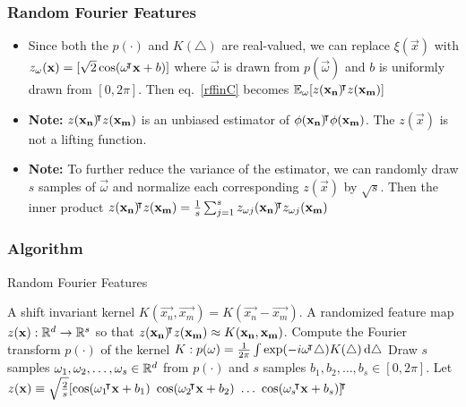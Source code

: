 \documentclass[10pt]{../formats/RU}
\begin{document}
\begin{frame}
  \frametitle{Random Fourier Features}
  \begin{itemize}
    \item <1-> Since both the $p(\cdot)$ and $K(\triangle)$ are real-valued, we can replace $\xi(\vec{x})$ with $z_{\mathbf{\omega}}(\mathbf{x})=[\sqrt{2}\cos(\mathbf{\omega}{}^{\mkern-4mu\intercal}\mathbf{x}+b)]$ where $\vec{\omega}$ is drawn from $p(\vec{\omega})$ and $b$ is uniformly drawn from $[0, 2\pi]$. Then eq.~\eqref{rffinC} becomes $\mathbb{E}_{\mathbf{\omega}}[z(\mathbf{x_n}){}^{\mkern-4mu\intercal} z(\mathbf{x_m})]$
    \item <2-> \textbf{Note:} $z(\mathbf{x_n}){}^{\mkern-4mu\intercal} z(\mathbf{x_m})$ is an unbiased estimator of $\phi(\mathbf{x_n}){}^{\mkern-4mu\intercal}\phi(\mathbf{x_m})$. The $z(\vec{x})$ is not a lifting function.
    \item <3-> \textbf{Note:} To further reduce the variance of the estimator, we can randomly draw $s$ samples of $\vec{\omega}$ and normalize each corresponding $z(\vec{x})$ by $\sqrt{s}$. Then the inner product $z(\mathbf{x_n}){}^{\mkern-4mu\intercal} z(\mathbf{x_m})=\frac{1}{s}\sum_{j=1}^{s}z_{\mathbf{\omega}j}(\mathbf{x_n}){}^{\mkern-4mu\intercal} z_{\mathbf{\omega}j}(\mathbf{x_m})$
  \end{itemize}
\end{frame}
\begin{frame}
  \frametitle{Algorithm}
  \begin{algorithm}[H]
    \caption{Random Fourier Features}\label{RFF}
    \begin{algorithmic}
    \Require A shift invariant kernel $K(\vec{x_n}, \vec{x_m}) = K(\vec{x_n}- \vec{x_m})$.
    \Ensure A randomized feature map $z(\mathbf{x}): \mathbb{R}^d\rightarrow\mathbb{R}^s$ so that $z(\mathbf{x_n}){}^{\mkern-4mu\intercal} z(\mathbf{x_m})\approx K(\mathbf{x_n}, \mathbf{x_m})$.
    \State Compute the Fourier transform $p(\cdot)$ of the kernel $K: p(\mathbf{\omega})=\frac{1}{2\pi}\int \exp(-i\mathbf{\omega}{}^{\mkern-4mu\intercal}\triangle)K(\triangle)\mathop{}\!\mathrm{d}\triangle$ 
    \State Draw $s$ \iid samples $\mathbf{\omega}_1, \mathbf{\omega}_2, \ldots, \mathbf{\omega}_s \in \mathbb{R}^d$ from $p(\cdot)$ and $s$ \iid samples $b_1, b_2, \ldots, b_s \in [0, 2\pi]$.
    \State Let $z(\vec{x})\equiv \sqrt{\frac{2}{s}}[\cos(\vec{\omega}_1\trn\vec{x}+b_1)\ \cos(\vec{\omega}_2\trn\vec{x}+b_2)\ \ldots\ \cos(\vec{\omega}_s\trn\vec{x}+b_s)]\trn$   
    \end{algorithmic}
  \end{algorithm}
\end{frame}
\end{document}
